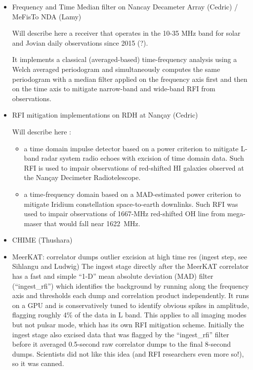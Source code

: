 \begin{itemize}
\item Frequency and Time Median filter on Nancay Decameter Array (Cedric) / MeFisTo NDA (Lamy)

Will describe here a receiver that operates in the 10-35 MHz band for solar and Jovian daily observations since 2015 (?).

It implements a classical (averaged-based) time-frequency analysis using a Welch averaged periodogram and simultaneously computes the same periodogram with a median filter applied on the frequency axis first and then on the time axis to mitigate narrow-band and wide-band RFI from observations.

\item RFI mitigation implementations on RDH at Nançay (Cedric)

Will describe here :
\begin{itemize}
\item a time domain impulse detector based on a power criterion to mitigate L-band radar system radio echoes with excision of time domain data.  Such RFI is used to impair observations of red-shifted HI galaxies observed at the Nançay Decimeter Radiotelescope.
\item a time-frequency domain based on a MAD-estimated power criterion to mitigate Iridium constellation space-to-earth downlinks.  Such RFI was used to impair observations of 1667-MHz red-shifted OH line from mega-maser that would fall near 1622\ MHz.
\end{itemize}


\item CHIME (Thushara)

\item MeerKAT: correlator dumps outlier excision at high time res (ingest step, see Sihlangu and Ludwig)
The ingest stage directly after the MeerKAT correlator has a fast and simple “1-D” mean absolute deviation (MAD) filter (“ingest\_rfi”) which identifies the background by running along the frequency axis and thresholds each dump and correlation product independently. It runs on a GPU and is conservatively tuned to identify obvious spikes in amplitude, flagging roughly 4\% of the data in L band. This applies to all imaging modes but not pulsar mode, which has its own RFI mitigation scheme.
Initially the ingest stage also excised data that was flagged by the “ingest\_rfi” filter before it averaged 0.5-second raw correlator dumps to the final 8-second dumps. Scientists did not like this idea (and RFI researchers even more so!), so it was canned.


\end{itemize}
